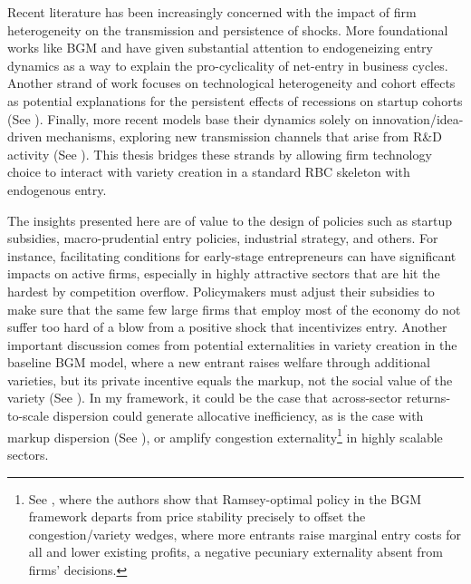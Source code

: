 \documentclass[a4paper,12pt]{article} %
\numberwithin{equation}{section} %
\numberwithin{figure}{section}
\numberwithin{table}{section}
\begin{document}
Recent literature has been increasingly concerned with the impact of firm heterogeneity on the transmission and persistence of shocks. More foundational works 
like BGM and \textcite{ghironi2007trade} have given substantial attention to endogeneizing entry dynamics as a way to explain the pro-cyclicality of net-entry in 
business cycles.
Another strand of work focuses on technological heterogeneity and cohort effects as potential explanations for the persistent effects of recessions on startup cohorts
(See \cite{sedlavcek2017growth,clementi2016entry}). Finally, more recent models base their dynamics solely on innovation/idea-driven mechanisms, exploring
new transmission channels that arise from R\&D activity (See \cite{anzoategui2019endogenous,comin2006medium}). This thesis bridges these strands by allowing firm technology choice to interact with variety creation
in a standard RBC skeleton with endogenous entry.

The insights presented here are of value to the design of policies such as startup subsidies, macro-prudential entry policies, industrial strategy, and others.
For instance, facilitating conditions for early-stage entrepreneurs can have significant impacts on active firms, especially in highly attractive sectors that are
hit the hardest by competition overflow. Policymakers must adjust their subsidies to make sure that the same few large firms that employ most of the economy do not
suffer too hard of a blow from a positive shock that incentivizes entry. Another important discussion comes from potential externalities in variety creation in the baseline BGM 
model, where a new entrant raises welfare through additional varieties, but its private incentive equals the markup, not the social value of the variety 
(See \cite{bilbiie2019monopoly}). In my framework, it could be the case that across-sector returns-to-scale dispersion could generate allocative inefficiency, 
as is the case with markup dispersion (See \cite{baqaee2020productivity}), or amplify congestion 
externality\footnote{ See \textcite{bilbiie2014optimal}, where the authors show that Ramsey-optimal policy in the BGM framework departs from
price stability precisely to offset the congestion/variety wedges, where more entrants raise marginal entry costs for all and lower existing profits, a 
negative pecuniary externality absent from firms' decisions.} in highly scalable sectors. 
\end{document}
